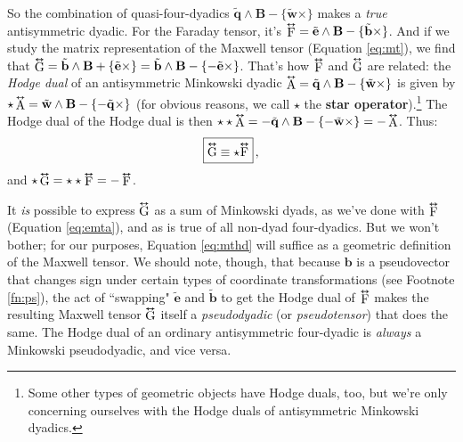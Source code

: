 \documentclass[12pt]{article}
\renewcommand{\vv}[1]{\mathbf{#1}}
\newcommand{\tightoverset}[2]{%
  \mathop{#2}\limits^{\vbox to -.5ex{\kern-0.75ex\hbox{$#1$}\vss}}}
\newcommand{\inlinedy}[1]{\tightoverset{\text{\tiny$\bm\leftrightarrow$}}{#1}}
\newcommand{\capdy}[1]{ \overset{ \text{\tiny$\bm\leftrightarrow$} }{\vphantom{\text{\small{A}}}\smash{#1}} }
\begin{document}
So the combination of quasi-four-dyadics $\tilde{\vv q} \wedge \vv B - \{ \tilde{\vv w} \times \}$ makes a \emph{true} antisymmetric dyadic. For the Faraday tensor, it's $\inlinedy{\mathrm{F}} = \tilde{\vv e} \wedge \vv B - \{ \tilde{\vv b} \times \}$. And if we study the matrix representation of the Maxwell tensor (Equation \ref{eq:mt}), we find that $\inlinedy{\mathrm{G}} = \tilde{\vv b} \wedge \vv B + \{ \tilde{\vv e} \times \} = \tilde{\vv b} \wedge \vv B - \{ - \tilde{\vv e} \times \}$. That's how $\inlinedy{\mathrm{F}}$ and $\inlinedy{\mathrm{G}}$ are related: the \emph{Hodge dual} of an antisymmetric Minkowski dyadic $\inlinedy{\mathrm{A}} = \tilde{\vv q} \wedge \vv B - \{ \tilde{\vv w} \times \}$ is given by $\star \inlinedy{\mathrm{A}} = \tilde{\vv w} \wedge \vv B - \{ - \tilde{\vv q} \times \}$ (for obvious reasons, we call $\star$ the \textbf{star operator}).\footnote{Some other types of geometric objects have Hodge duals, too, but we're only concerning ourselves with the Hodge duals of antisymmetric Minkowski dyadics.} The Hodge dual of the Hodge dual is then $\star \star \inlinedy{\mathrm{A}} = - \tilde{\vv q} \wedge \vv B - \{ - \tilde{\vv w} \times \} = - \inlinedy{\mathrm{A}}$. Thus:
\begin{equation}\label{eq:mthd}
\boxed{ \vphantom{A_{A_A}} \capdy{\mathrm{G}} \equiv \star \capdy{\mathrm{F}} } \, ,
\end{equation}
and $\star \inlinedy{\mathrm{G}} = \star \star \inlinedy{\mathrm{F}} = - \inlinedy{\mathrm{F}}$.

It \emph{is} possible to express $\inlinedy{\mathrm{G}}$ as a sum of Minkowski dyads, as we've done with $\inlinedy{\mathrm{F}}$ (Equation \ref{eq:emta}), and as is true of all non-dyad four-dyadics. But we won't bother; for our purposes, Equation \ref{eq:mthd} will suffice as a geometric definition of the Maxwell tensor. We should note, though, that because $\vv b$ is a pseudovector that changes sign under certain types of coordinate transformations (see Footnote \ref{fn:ps}), the act of ``swapping" $\tilde{\vv e}$ and $\tilde{\vv b}$ to get the Hodge dual of $\inlinedy{\mathrm{F}}$ makes the resulting Maxwell tensor $\inlinedy{\mathrm{G}}$ itself a \emph{pseudodyadic} (or \emph{pseudotensor}) that does the same. The Hodge dual of an ordinary antisymmetric four-dyadic is \emph{always} a Minkowski pseudodyadic, and vice versa.
\end{document}
